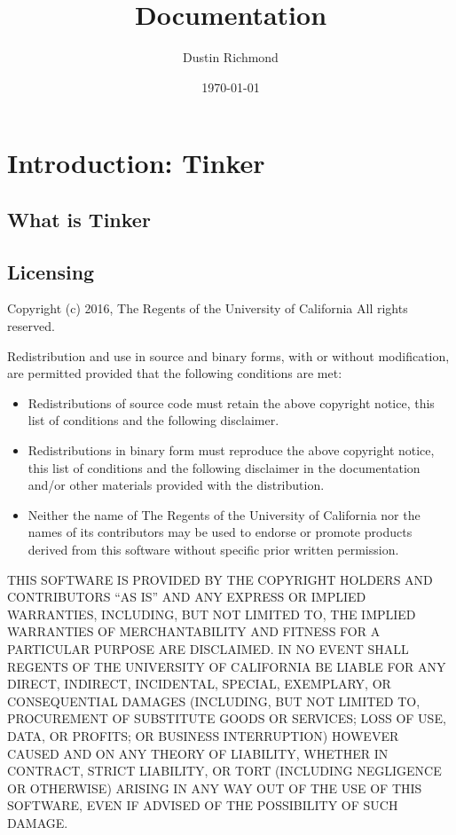 \documentclass{refrep}
\title{{\TinkerVersion} Documentation}
\author{Dustin Richmond}
\date{\today}
\begin{document}
\maketitle
\pagebreak
\tableofcontents

\chapter{Introduction: Tinker}
\section{What is Tinker}

\section{Licensing}

Copyright (c) 2016, The Regents of the University of California All rights
reserved.

Redistribution and use in source and binary forms, with or without modification,
are permitted provided that the following conditions are met:

\begin{itemize}
    \item Redistributions of source code must retain the above copyright
      notice, this list of conditions and the following disclaimer.

    \item Redistributions in binary form must reproduce the above
      copyright notice, this list of conditions and the following
      disclaimer in the documentation and/or other materials provided
      with the distribution.

    \item Neither the name of The Regents of the University of California
      nor the names of its contributors may be used to endorse or
      promote products derived from this software without specific
      prior written permission.
\end{itemize}

THIS SOFTWARE IS PROVIDED BY THE COPYRIGHT HOLDERS AND CONTRIBUTORS ``AS IS''
AND ANY EXPRESS OR IMPLIED WARRANTIES, INCLUDING, BUT NOT LIMITED TO, THE
IMPLIED WARRANTIES OF MERCHANTABILITY AND FITNESS FOR A PARTICULAR PURPOSE ARE
DISCLAIMED. IN NO EVENT SHALL REGENTS OF THE UNIVERSITY OF CALIFORNIA BE LIABLE
FOR ANY DIRECT, INDIRECT, INCIDENTAL, SPECIAL, EXEMPLARY, OR CONSEQUENTIAL
DAMAGES (INCLUDING, BUT NOT LIMITED TO, PROCUREMENT OF SUBSTITUTE GOODS OR
SERVICES; LOSS OF USE, DATA, OR PROFITS; OR BUSINESS INTERRUPTION) HOWEVER
CAUSED AND ON ANY THEORY OF LIABILITY, WHETHER IN CONTRACT, STRICT LIABILITY, OR
TORT (INCLUDING NEGLIGENCE OR OTHERWISE) ARISING IN ANY WAY OUT OF THE USE OF
THIS SOFTWARE, EVEN IF ADVISED OF THE POSSIBILITY OF SUCH DAMAGE.
\end{document}

